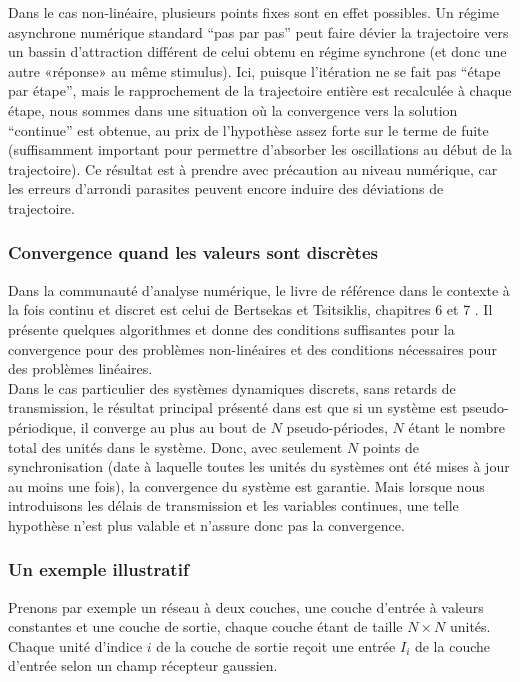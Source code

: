 Dans le cas non-linéaire, plusieurs points fixes sont en effet possibles. Un régime asynchrone numérique standard ``pas par pas'' peut faire dévier la trajectoire vers un bassin d'attraction différent de celui obtenu en régime synchrone (et donc une autre «réponse» au même stimulus). Ici, puisque l'itération ne se fait pas ``étape par étape'', mais le rapprochement de la trajectoire entière est recalculée à chaque étape, nous sommes dans une situation où la convergence vers la solution ``continue'' est obtenue, au prix de l'hypothèse assez forte sur le terme de fuite (suffisamment important pour permettre d'absorber les oscillations au début de la trajectoire). Ce résultat est à prendre avec précaution au niveau numérique, car les erreurs d'arrondi parasites peuvent encore induire des déviations de trajectoire.\\

\subsubsection{Convergence quand les valeurs sont discrètes}

Dans la communauté d'analyse numérique, le livre de référence dans le contexte à la fois continu et discret est celui de Bertsekas et Tsitsiklis, chapitres 6 et 7 \cite{Bertsekas:1997}. Il présente quelques algorithmes et donne des conditions suffisantes pour la convergence pour des problèmes non-linéaires et des conditions nécessaires pour des problèmes linéaires.\\

Dans le cas particulier des systèmes dynamiques discrets, sans retards de transmission, le résultat principal présenté dans \cite{Robert:1994, Bahi:2002} est que si un système est pseudo-périodique, il converge au plus au bout de $N$ pseudo-périodes, $N$ étant le nombre total des unités dans le système. Donc, avec seulement $N$ points de synchronisation (date à laquelle toutes les unités du systèmes ont été mises à jour au moins une fois), la convergence du système est garantie. Mais lorsque nous introduisons les délais de transmission et les variables continues, une telle hypothèse n'est plus valable et n'assure donc pas la convergence.\\

\subsubsection{Un exemple illustratif}

Prenons par exemple un réseau à deux couches, une couche d'entrée à valeurs constantes et une couche de sortie, chaque couche étant de taille $ N \times N $ unités. Chaque unité d'indice $i$ de la couche de sortie reçoit une entrée $I_{i}$ de la couche d'entrée selon un champ récepteur gaussien.\\

